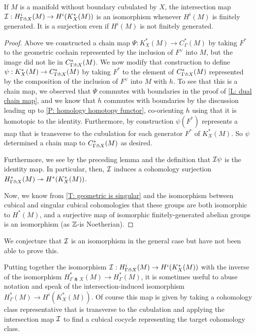 \begin{theorem}\label{T: intersection qi}
If $M$ is a manifold without boundary cubulated by $X$, the intersection map $\mathcal{I}: H^i_{\Gamma\pitchfork X}(M) \to H^i(K_X^*(M))$ is an isomorphism whenever $H^i(M)$ is finitely generated. It is a surjection even if $H^i(M)$ is not finitely generated.
\end{theorem}
\begin{proof}
Above we constructed a chain map $\Psi:K_X^*(M) \to C_\Gamma^*(M)$ by taking $F^*$ to the geometric cochain represented by the inclusion of $F^\vee$ into $M$, but the image did not lie in $C^*_{\Gamma\pitchfork X}(M)$. We now modify that construction to define $\psi:K_X^*(M) \to C_{\Gamma\pitchfork X}^*(M)$ by taking $F^*$ to the element of $C^*_{\Gamma\pitchfork X}(M)$ represented by the composition of the inclusion of $F^\vee$ into $M$ with $h$. To see that this is a chain map, we observed that $\Psi$ commutes with boundaries in the proof of \cref{L: dual chain map}, and we know that $h$ commutes with boundaries by the discussion leading up to \cref{P: homology homotopy functor}, co-orienting $h$ using that it is homotopic to the identity. Furthermore, by construction $\psi(F^*)$ represents a map that is transverse to the cubulation for each generator $F^*$ of $K_X^*(M)$. So $\psi$ determined a chain map to $C_{\Gamma\pitchfork X}^*(M)$ as desired.

 Furthermore, we see by the preceding lemma and the definition that $\mathcal{I}\psi$ is the identity map. In particular, then, $\mathcal{I}$ induces a cohomology surjection $H^*_{\Gamma\pitchfork X}(M)\twoheadrightarrow H^*(K_X^*(M))$.

Now, we know from \cref{T: geometric is singular} and the isomorphism between cubical and singular cubical cohomologies that these groups are both isomorphic to $H^*(M)$, and a surjective map of isomorphic finitely-generated abelian groups is an isomorphism (as $\mathbb{Z}$-is Noetherian).
\end{proof}

We conjecture that $\mathcal{I}$ is an isomorphism in the general case but have not been able to prove this.

\begin{remark}\label{R: intersection map extension}
Putting together the isomorphism $\mathcal{I}: H^i_{\Gamma\pitchfork X}(M) \to H^i(K_X^*(M))$ with the inverse of the isomorphism $H^*_{\Gamma \pitchfork X}(M) \to H^*_\Gamma(M)$, it is sometimes useful to abuse notation and speak of the intersection-induced isomorphism
 $H^*_\Gamma(M) \to H^i(K_X^*(M))$. Of course this map is given by taking a cohomology class representative that is transverse to the cubulation and applying the intersection map $\mathcal{I}$ to find a cubical cocycle representing the target cohomology class.
\end{remark}

